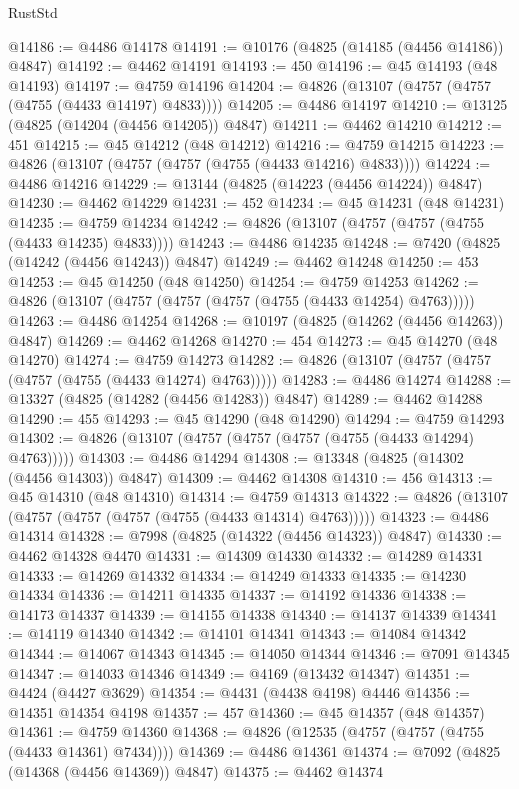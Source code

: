 \begin{lexlean}{RustStd}
\begin{coremodule}
@14186 := @4486 @14178
@14191 := @10176 (@4825 (@14185 (@4456 @14186)) @4847)
@14192 := @4462 @14191
@14193 := 450
@14196 := @45 @14193 (@48 @14193)
@14197 := @4759 @14196
@14204 := @4826 (@13107 (@4757 (@4757 (@4755 (@4433 @14197) @4833))))
@14205 := @4486 @14197
@14210 := @13125 (@4825 (@14204 (@4456 @14205)) @4847)
@14211 := @4462 @14210
@14212 := 451
@14215 := @45 @14212 (@48 @14212)
@14216 := @4759 @14215
@14223 := @4826 (@13107 (@4757 (@4757 (@4755 (@4433 @14216) @4833))))
@14224 := @4486 @14216
@14229 := @13144 (@4825 (@14223 (@4456 @14224)) @4847)
@14230 := @4462 @14229
@14231 := 452
@14234 := @45 @14231 (@48 @14231)
@14235 := @4759 @14234
@14242 := @4826 (@13107 (@4757 (@4757 (@4755 (@4433 @14235) @4833))))
@14243 := @4486 @14235
@14248 := @7420 (@4825 (@14242 (@4456 @14243)) @4847)
@14249 := @4462 @14248
@14250 := 453
@14253 := @45 @14250 (@48 @14250)
@14254 := @4759 @14253
@14262 := @4826 (@13107 (@4757 (@4757 (@4757 (@4755 (@4433 @14254) @4763)))))
@14263 := @4486 @14254
@14268 := @10197 (@4825 (@14262 (@4456 @14263)) @4847)
@14269 := @4462 @14268
@14270 := 454
@14273 := @45 @14270 (@48 @14270)
@14274 := @4759 @14273
@14282 := @4826 (@13107 (@4757 (@4757 (@4757 (@4755 (@4433 @14274) @4763)))))
@14283 := @4486 @14274
@14288 := @13327 (@4825 (@14282 (@4456 @14283)) @4847)
@14289 := @4462 @14288
@14290 := 455
@14293 := @45 @14290 (@48 @14290)
@14294 := @4759 @14293
@14302 := @4826 (@13107 (@4757 (@4757 (@4757 (@4755 (@4433 @14294) @4763)))))
@14303 := @4486 @14294
@14308 := @13348 (@4825 (@14302 (@4456 @14303)) @4847)
@14309 := @4462 @14308
@14310 := 456
@14313 := @45 @14310 (@48 @14310)
@14314 := @4759 @14313
@14322 := @4826 (@13107 (@4757 (@4757 (@4757 (@4755 (@4433 @14314) @4763)))))
@14323 := @4486 @14314
@14328 := @7998 (@4825 (@14322 (@4456 @14323)) @4847)
@14330 := @4462 @14328 @4470
@14331 := @14309 @14330
@14332 := @14289 @14331
@14333 := @14269 @14332
@14334 := @14249 @14333
@14335 := @14230 @14334
@14336 := @14211 @14335
@14337 := @14192 @14336
@14338 := @14173 @14337
@14339 := @14155 @14338
@14340 := @14137 @14339
@14341 := @14119 @14340
@14342 := @14101 @14341
@14343 := @14084 @14342
@14344 := @14067 @14343
@14345 := @14050 @14344
@14346 := @7091 @14345
@14347 := @14033 @14346
@14349 := @4169 (@13432 @14347)
@14351 := @4424 (@4427 @3629)
@14354 := @4431 (@4438 @4198) @4446
@14356 := @14351 @14354 @4198
@14357 := 457
@14360 := @45 @14357 (@48 @14357)
@14361 := @4759 @14360
@14368 := @4826 (@12535 (@4757 (@4757 (@4755 (@4433 @14361) @7434))))
@14369 := @4486 @14361
@14374 := @7092 (@4825 (@14368 (@4456 @14369)) @4847)
@14375 := @4462 @14374

\end{coremodule}
\end{lexlean}
